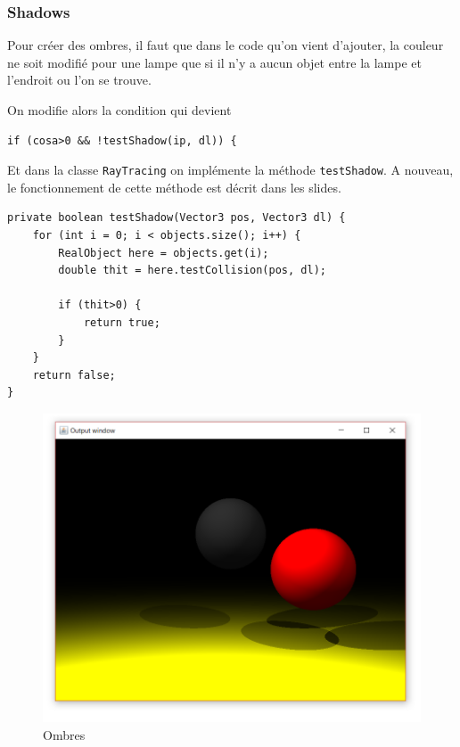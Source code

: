 \subsubsection{Shadows}

Pour créer des ombres, il faut que dans le code qu'on vient d'ajouter, la couleur ne soit modifié pour une lampe que si il n'y a aucun objet entre la lampe et l'endroit ou l'on se trouve.

On modifie alors la condition qui devient 

\begin{lstlisting}
if (cosa>0 && !testShadow(ip, dl)) {
\end{lstlisting}

Et dans la classe \texttt{RayTracing} on implémente la méthode \texttt{testShadow}. A nouveau, le fonctionnement de cette méthode est décrit dans les slides.

\begin{lstlisting}
private boolean testShadow(Vector3 pos, Vector3 dl) {
    for (int i = 0; i < objects.size(); i++) {
        RealObject here = objects.get(i);
        double thit = here.testCollision(pos, dl);
        
        if (thit>0) {
            return true;
        }
    }
    return false;
}
\end{lstlisting}

\begin{figure}[H]
	\caption{\label{10_2} Ombres}
	\centering
	\includegraphics[scale = 0.4]{Figures/10_2.png}
\end{figure}

